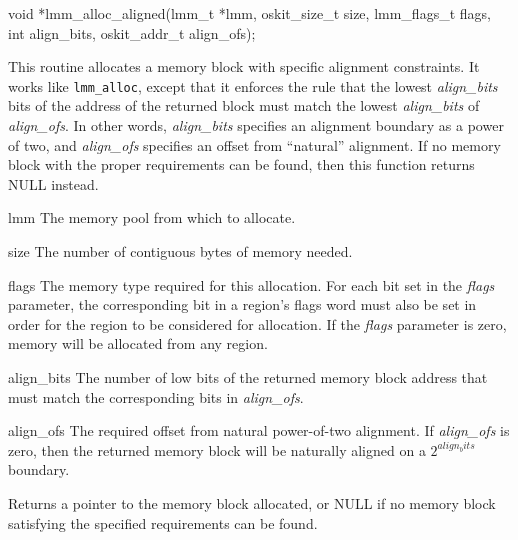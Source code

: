 \begin{apisyn}

	\funcproto void *lmm_alloc_aligned(lmm_t *lmm, oskit_size_t size,
		lmm_flags_t flags,
		int align_bits, oskit_addr_t align_ofs);
\end{apisyn}
\begin{apidesc}
	This routine allocates a memory block
	with specific alignment constraints.
	It works like {\tt lmm_alloc},
	except that it enforces the rule that
	the lowest \emph{align_bits} bits of the address of the returned block
	must match the lowest \emph{align_bits} of \emph{align_ofs}.
	In other words,
	\emph{align_bits} specifies an alignment boundary as a power of two,
	and \emph{align_ofs} specifies an offset from ``natural'' alignment.
	If no memory block with the proper requirements can be found,
	then this function returns NULL instead.
\end{apidesc}
\begin{apiparm}
	\item[lmm]
		The memory pool from which to allocate.
	\item[size]
		The number of contiguous bytes of memory needed.
	\item[flags]
		The memory type required for this allocation.
		For each bit set in the \emph{flags} parameter,
		the corresponding bit in a region's flags word must also be set
		in order for the region to be considered for allocation.
		If the \emph{flags} parameter is zero,
		memory will be allocated from any region.
	\item[align_bits]
		The number of low bits of the returned memory block address
		that must match the corresponding bits in \emph{align_ofs}.
	\item[align_ofs]
		The required offset from natural power-of-two alignment.
		If \emph{align_ofs} is zero,
		then the returned memory block will be naturally aligned
		on a $2^{align_bits}$ boundary.
\end{apiparm}
\begin{apiret}
	Returns a pointer to the memory block allocated,
	or NULL if no memory block satisfying the specified requirements
	can be found.
\end{apiret}

